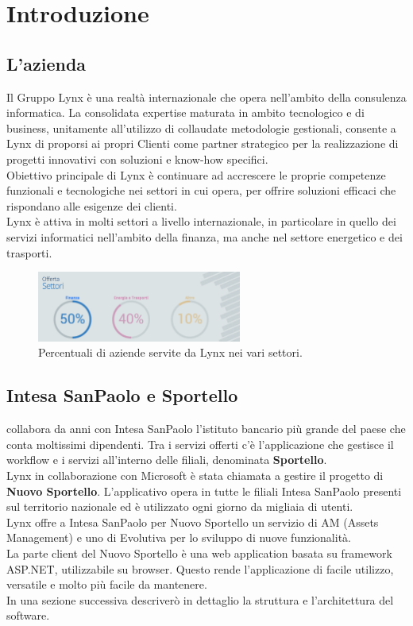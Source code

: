 \section{Introduzione}

\subsection{L'azienda}
Il Gruppo Lynx è una realtà internazionale che opera nell'ambito della consulenza informatica. La consolidata expertise maturata in ambito tecnologico e di business, unitamente all'utilizzo di collaudate metodologie gestionali, consente a Lynx di proporsi ai propri Clienti come partner strategico per la realizzazione di progetti innovativi con soluzioni e know-how specifici. \\
Obiettivo principale di Lynx è continuare ad accrescere le proprie competenze funzionali e tecnologiche nei settori in cui opera, per offrire soluzioni efficaci che rispondano alle esigenze dei clienti. \\
Lynx è attiva in molti settori a livello internazionale, in particolare in quello dei servizi informatici nell'ambito della finanza, ma anche nel settore energetico e dei trasporti. \\

\begin{figure}[!ht]
	\centering
	\includegraphics[width=0.6\textwidth]{./res/img/settori.png}
	\caption{Percentuali di aziende servite da Lynx nei vari settori.}
\end{figure}

\subsection{Intesa SanPaolo e Sportello}
\azienda collabora da anni con Intesa SanPaolo l'istituto bancario più grande del paese che conta moltissimi dipendenti. Tra i servizi offerti c'è l'applicazione che gestisce il workflow e i servizi all'interno delle filiali, denominata \textbf{Sportello}. \\
Lynx in collaborazione con Microsoft è stata chiamata a gestire il progetto di \textbf{Nuovo Sportello}. L'applicativo opera in tutte le filiali Intesa SanPaolo presenti sul territorio nazionale ed è utilizzato ogni giorno da migliaia di utenti. \\
Lynx offre a Intesa SanPaolo per Nuovo Sportello un servizio di AM (Assets Management) e uno di Evolutiva per lo sviluppo di nuove funzionalità. \\
La parte client del Nuovo Sportello è una web application basata su framework ASP.NET, utilizzabile su browser. Questo rende l'applicazione di facile utilizzo, versatile e molto più facile da mantenere. \\ 
In una sezione successiva descriverò in dettaglio la struttura e l'architettura del software. \\

